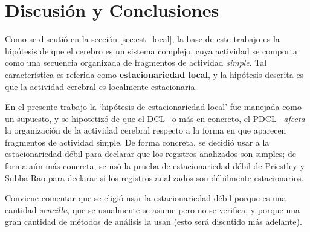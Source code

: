\documentclass[12pt,letterpaper]{book}
\begin{document}


\chapter{Discusión y Conclusiones}


Como se discutió en la sección \ref{sec:est_local}, la base de este trabajo es la hipótesis 
de que el cerebro es un sistema complejo, cuya actividad se comporta como una secuencia organizada de fragmentos de actividad \textit{simple}.
%
Tal característica es referida como \textbf{estacionariedad local}, y la hipótesis descrita es que la actividad cerebral es localmente estacionaria.

En el presente trabajo la `hipótesis de estacionariedad local' fue manejada como un supuesto, y se hipotetizó de que el DCL --o más en concreto, el PDCL-- \textit{afecta} la organización de la actividad cerebral respecto a la forma en que aparecen fragmentos de actividad simple.
%
De forma concreta, se decidió usar a la estacionariedad débil para declarar que los registros analizados son simples; de forma aún más concreta, se usó la prueba de estacionariedad débil de Priestley y Subba Rao para declarar si los registros analizados son débilmente estacionarios.

Conviene comentar que se eligió usar la estacionariedad débil porque es una cantidad \textit{sencilla}, que se usualmente se asume pero no se verifica, y porque una gran cantidad de métodos de análisis la usan (esto será discutido más adelante).
%
\end{document}
